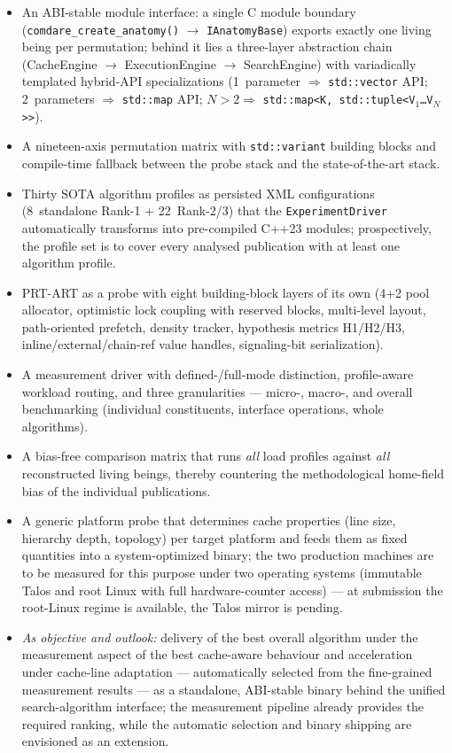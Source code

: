\begin{itemize}
  \item An ABI-stable module interface: a single C module boundary
  (\texttt{comdare\_\allowbreak{}create\_anatomy()} $\to$ \texttt{IAnatomyBase}) exports exactly one
  living being per permutation; behind it lies a three-layer abstraction chain (CacheEngine $\to$
  ExecutionEngine $\to$ SearchEngine) with variadically templated hybrid-API specializations
  (1~parameter $\Rightarrow$ \texttt{std::vector} API\@; 2~parameters $\Rightarrow$ \texttt{std::map}
  API\@; $N>2 \Rightarrow$ \texttt{std::map<K,\,std::tuple<V$_1$\ldots V$_N$>>}).
  \item A nineteen-axis permutation matrix with \texttt{std::variant} building blocks and
  compile-time fallback between the probe stack and the state-of-the-art stack.
  \item Thirty SOTA algorithm profiles as persisted XML configurations (8~standalone Rank-1 +
  22~Rank-2/3) that the \texttt{ExperimentDriver} automatically transforms into pre-compiled C++23
  modules; prospectively, the profile set is to cover every analysed publication with at least one
  algorithm profile.
  \item PRT-ART as a probe with eight building-block layers of its own (4+2 pool allocator,
  optimistic lock coupling with reserved blocks, multi-level layout, path-oriented prefetch, density
  tracker, hypothesis metrics H1/H2/H3, inline/external/chain-ref value handles, signaling-bit
  serialization).
  \item A measurement driver with defined-/full-mode distinction, profile-aware workload routing,
  and three granularities --- micro-, macro-, and overall benchmarking (individual constituents,
  interface operations, whole algorithms).
  \item A bias-free comparison matrix that runs \emph{all} load profiles against \emph{all}
  reconstructed living beings, thereby countering the methodological home-field bias of the
  individual publications.
  \item A generic platform probe that determines cache properties (line size, hierarchy depth,
  topology) per target platform and feeds them as fixed quantities into a system-optimized binary;
  the two production machines are to be measured for this purpose under two operating systems
  (immutable Talos and root Linux with full hardware-counter access) --- at submission the
  root-Linux regime is available, the Talos mirror is pending.
  \item \emph{As objective and outlook:} delivery of the best overall algorithm under the
  measurement aspect of the best cache-aware behaviour and acceleration under cache-line adaptation
  --- automatically selected from the fine-grained measurement results --- as a standalone,
  ABI-stable binary behind the unified search-algorithm interface; the measurement pipeline already
  provides the required ranking, while the automatic selection and binary shipping are envisioned as
  an extension.
\end{itemize}

